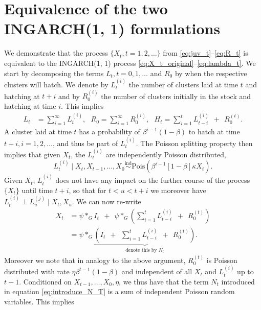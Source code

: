 \documentclass[review]{elsarticle}
\begin{document}
\appendix
\section{Equivalence of the two INGARCH(1, 1) formulations}
\label{appendix:proof}

We demonstrate that the process $\{X_t, t = 1, 2, \dots\}$ from \eqref{eq:juv_t}--\eqref{eq:R_t} is equivalent to the INGARCH(1, 1) process \eqref{eq:X_t_original}--\eqref{eq:lambda_t}. We start by decomposing the terms $L_t, t = 0, 1, \dots$ and $R_0$ by when the respective clusters will hatch. We denote by $L_t^{(i)}$ the number of clusters laid at time $t$ and hatching at $t + i$ and by $R^{(i)}_0$ the number of clusters initially in the stock and hatching at time $i$. This implies
\begin{align*}
L_t & = \sum_{i = 1}^\infty L_t^{(i)}, \ \ \ 
R_0 = \sum_{i = 1}^\infty R_0^{(i)}, \ \ \ 
H_t = \sum_{i = 1}^{t} L_{t - i}^{(i)} \ \ + \ \ R_0^{(t)}.
\end{align*}
A cluster laid at time $t$ has a probability of $\beta^{i - 1}(1 - \beta)$ to hatch at time $t + i, i = 1, 2, \dots$, and thus be part of $L_t^{(i)}$. The Poisson splitting property \cite{Kingman1993} then implies that given $X_t$, the $L_t^{(i)}$ are independently Poisson distributed,
$$
L_t^{(i)} \mid X_t, X_{t - 1}, \dots, X_0 \stackrel{\text{ind}}{\sim} \text{Pois}(\beta^{i - 1}[1 - \beta]\kappa X_t). %
$$
Given $X_t$, $L_t^{(i)}$ does not have any impact on the further course of the process $\{X_t\}$ until time $t + i$, so that for $t < u < t + i$ we moreover have $L_t^{(i)} \perp L_u^{(j)} \mid X_t, X_u$. We can now re-write
\begin{align}
X_t & = \psi *_G I_t \ \ + \ \ \psi *_G\left(\sum_{i = 1}^{t} L_{t - i}^{(i)} \ \ + \ \ R_0^{(t)}\right)\nonumber \\
& = \psi *_G \underbrace{\left( I_t \ \ + \ \ \sum_{i = 1}^{t} L_{t - i}^{(i)} \ \ + \ \ R_0^{(t)}\right)}_{\text{denote this by } N_t}. \label{eq:introduce_N_T}
\end{align}
Moreover we note that in analogy to the above argument, $R_0^{(t)}$ is Poisson distributed with rate $\eta\beta^{t - 1}(1 - \beta)$ and independent of all $X_t$ and $L_t^{(i)}$ up to $t - 1$. Conditioned on $X_{t - 1}, \dots, X_0, \eta$, we thus have that the term $N_t$ introduced in equation \eqref{eq:introduce_N_T} is a sum of independent Poisson random variables. This implies
\end{document}

